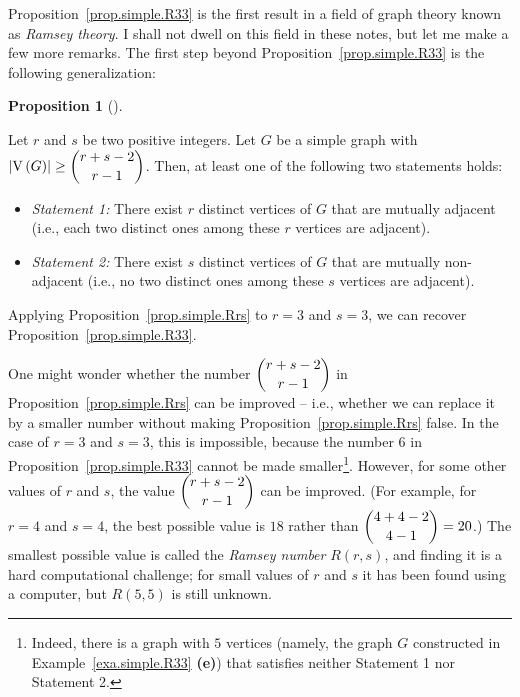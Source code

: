 \documentclass[numbers=enddot,12pt,final,onecolumn,notitlepage]{scrartcl}%
\theoremstyle{definition}
\newtheorem{prop}[theo]{Proposition}
\newenvironment{proposition}[1][]
{\begin{prop}[#1]\begin{leftbar}}
{\end{leftbar}\end{prop}}
\newcommand{\abs}[1]{\left| #1 \right|}
\newcommand{\tup}[1]{\left( #1 \right)}
\newcommand{\verts}[1]{\operatorname{V}\left( #1 \right)}
\begin{document}
Proposition~\ref{prop.simple.R33} is the first result in a field
of graph theory known as \textit{Ramsey theory}. I shall not dwell on
this field in these notes, but let me make a few more remarks.
The first step beyond Proposition~\ref{prop.simple.R33} is the
following generalization:

\begin{proposition} \label{prop.simple.Rrs}
Let $r$ and $s$ be two positive integers.
Let $G$ be a simple graph with
$\abs{\verts{G}} \geq \dbinom{r+s-2}{r-1}$.
Then, at least one of the following two statements holds:

\begin{itemize}
\item \textit{Statement 1:} There exist $r$ distinct vertices
of $G$ that are mutually adjacent (i.e., each two distinct ones among
these $r$ vertices are adjacent).

\item \textit{Statement 2:} There exist $s$ distinct vertices
of $G$ that are mutually non-adjacent (i.e., no two distinct ones
among these $s$ vertices are adjacent).
\end{itemize}
\end{proposition}

Applying Proposition~\ref{prop.simple.Rrs} to $r=3$ and $s=3$, we can
recover Proposition~\ref{prop.simple.R33}.

One might wonder whether the number $\dbinom{r+s-2}{r-1}$ in
Proposition~\ref{prop.simple.Rrs} can be improved -- i.e., whether we
can replace it by a smaller number without making
Proposition~\ref{prop.simple.Rrs} false. In the case of $r=3$ and
$s=3$, this is impossible, because the number $6$ in
Proposition~\ref{prop.simple.R33} cannot be made
smaller\footnote{Indeed, there is a graph with $5$ vertices (namely,
the graph $G$ constructed in
Example~\ref{exa.simple.R33} \textbf{(e)}) that
satisfies neither Statement 1 nor Statement 2.}. However, for some
other values of $r$ and $s$, the value $\dbinom{r+s-2}{r-1}$ can be
improved. (For example, for $r=4$ and $s=4$, the best possible value
is $18$ rather than $\dbinom{4+4-2}{4-1}=20$.) The smallest possible
value is called the \textit{Ramsey number} $R\tup{r,s}$, and
finding it is a hard computational challenge; for small values of $r$
and $s$ it has been found using a computer, but $R\tup{5,5}$ is still
unknown.
\end{document}
